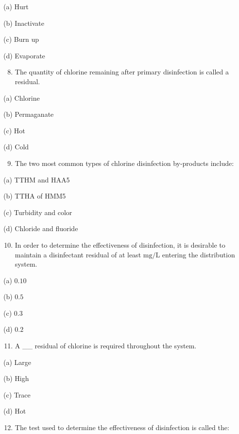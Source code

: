 \documentclass[10pt]{article}
\begin{document}
\begin{enumerate}
\begin{enumerate}
(a) Hurt

(b) Inactivate

(c) Burn up

(d) Evaporate

\begin{enumerate}
  \setcounter{enumi}{7}
  \item The quantity of chlorine remaining after primary disinfection is called a residual.
\end{enumerate}

(a) Chlorine

(b) Permaganate

(c) Hot

(d) Cold

\begin{enumerate}
  \setcounter{enumi}{8}
  \item The two most common types of chlorine disinfection by-products include:
\end{enumerate}

(a) TTHM and HAA5

(b) TTHA of HMM5

(c) Turbidity and color

(d) Chloride and fluoride

\begin{enumerate}
  \setcounter{enumi}{9}
  \item In order to determine the effectiveness of disinfection, it is desirable to maintain a disinfectant residual of at least $\mathrm{mg} / \mathrm{L}$ entering the distribution system.
\end{enumerate}

(a) $0.10$

(b) $0.5$

(c) $0.3$

(d) $0.2$

\begin{enumerate}
  \setcounter{enumi}{10}
  \item A \_\_ residual of chlorine is required throughout the system.
\end{enumerate}

(a) Large

(b) High

(c) Trace

(d) Hot

\begin{enumerate}
  \setcounter{enumi}{11}
  \item The test used to determine the effectiveness of disinfection is called the:



\end{enumerate}
\end{enumerate}
\end{enumerate}
\end{document}
